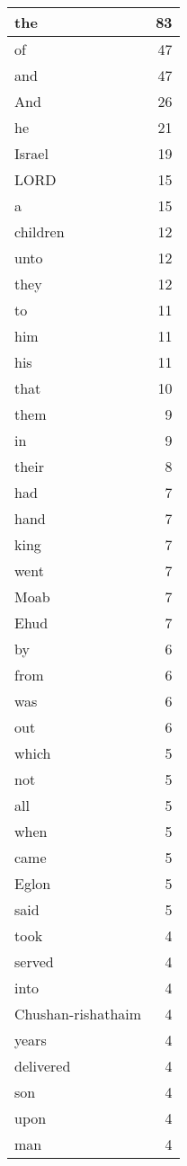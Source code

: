 \begin{center}
\begin{longtable}{l|r}
\hline \hline
\endlastfoot
the & 83 \\ \hline
of & 47 \\ \hline
and & 47 \\ \hline
And & 26 \\ \hline
he & 21 \\ \hline
Israel & 19 \\ \hline
LORD & 15 \\ \hline
a & 15 \\ \hline
children & 12 \\ \hline
unto & 12 \\ \hline
they & 12 \\ \hline
to & 11 \\ \hline
him & 11 \\ \hline
his & 11 \\ \hline
that & 10 \\ \hline
them & 9 \\ \hline
in & 9 \\ \hline
their & 8 \\ \hline
had & 7 \\ \hline
hand & 7 \\ \hline
king & 7 \\ \hline
went & 7 \\ \hline
Moab & 7 \\ \hline
Ehud & 7 \\ \hline
by & 6 \\ \hline
from & 6 \\ \hline
was & 6 \\ \hline
out & 6 \\ \hline
which & 5 \\ \hline
not & 5 \\ \hline
all & 5 \\ \hline
when & 5 \\ \hline
came & 5 \\ \hline
Eglon & 5 \\ \hline
said & 5 \\ \hline
took & 4 \\ \hline
served & 4 \\ \hline
into & 4 \\ \hline
Chushan-rishathaim & 4 \\ \hline
years & 4 \\ \hline
delivered & 4 \\ \hline
son & 4 \\ \hline
upon & 4 \\ \hline
man & 4 \\ \hline

\end{longtable}
\end{center}
